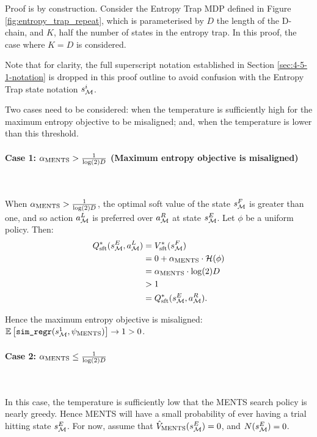     \thrmMENTSbadmdp*
    
    \begin{proofoutline}
        Proof is by construction. Consider the Entropy Trap MDP defined in Figure \ref{fig:entropy_trap_repeat}, which is parameterised by $D$ the length of the D-chain, and $K$, half the number of states in the entropy trap. In this proof, the case where $K=D$ is considered.

        Note that for clarity, the full superscript notation established in Section \ref{sec:4-5-1-notation} is dropped in this proof outline to avoid confusion with the Entropy Trap state notation $s^{i}_{\mathcal{M}}$.

        Two cases need to be considered: when the temperature is sufficiently high for the maximum entropy objective to be misaligned; and, when the temperature is lower than this threshold.
        
        \paragraph{Case 1: ${\alpha_{{\textnormal{MENTS}}}}>\frac{1}{\log(2)D}$ (Maximum entropy objective is misaligned)} $ $ 
        
        When ${\alpha_{{\textnormal{MENTS}}}}>\frac{1}{\log(2)D}$, the optimal soft value of the state $s^{F}_{\mathcal{M}}$ is greater than one, and so action $a^L_{\mathcal{M}}$ is preferred over $a^R_{\mathcal{M}}$ at state $s^{E}_{\mathcal{M}}$. Let $\phi$ be a uniform policy. Then:
        \begin{align}
            Q_{{\textnormal{sft}}}^*(s^{E}_{\mathcal{M}}, a^L_{\mathcal{M}}) 
                &= V_{{\textnormal{sft}}}^*(s^{F}_{\mathcal{M}}) \\
                &= 0 + {\alpha_{{\textnormal{MENTS}}}} \cdot \mathcal{H}(\phi) \\
                &= {\alpha_{{\textnormal{MENTS}}}} \cdot \log(2) D \\
                & > 1 \\
                &= Q_{{\textnormal{sft}}}^*(s^{E}_{\mathcal{M}}, a^R_{\mathcal{M}}).
        \end{align}

        Hence the maximum entropy objective is misaligned: $\mathbb{E}\left[{\textnormal{\texttt{sim\_regr}}}(s^{1}_{\mathcal{M}},\psi_{{\textnormal{MENTS}}})\right] \rightarrow 1 > 0$. %

        \paragraph{Case 2: ${\alpha_{{\textnormal{MENTS}}}}\leq\frac{1}{\log(2)D}$} $ $ 

        In this case, the temperature is sufficiently low that the MENTS search policy is nearly greedy. Hence MENTS will have a small probability of ever having a trial hitting state $s^{E}_{\mathcal{M}}$. For now, assume that ${\hat{V}_{{\textnormal{MENTS}}}}(s^{E}_{\mathcal{M}}) = 0$, and $N(s^{E}_{\mathcal{M}}) = 0$.
        

\end{proofoutline}

